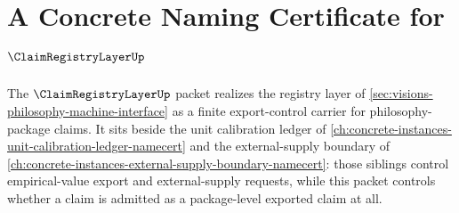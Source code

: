 \chapter{A Concrete Naming Certificate for $\ClaimRegistryLayerUp$}
\label{ch:concrete-instances-claimregistrylayer-namecert}

The $\ClaimRegistryLayerUp$ packet realizes the registry layer of \autoref{sec:visions-philosophy-machine-interface} as a finite export-control carrier for philosophy-package claims. It sits beside the unit calibration ledger of \autoref{ch:concrete-instances-unit-calibration-ledger-namecert} and the external-supply boundary of \autoref{ch:concrete-instances-external-supply-boundary-namecert}: those siblings control empirical-value export and external-supply requests, while this packet controls whether a claim is admitted as a package-level exported claim at all.

